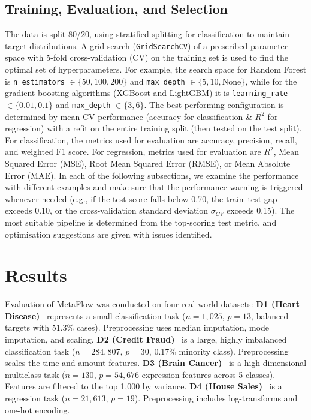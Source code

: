 \documentclass[runningheads]{llncs}
\begin{document}
\subsection{Training, Evaluation, and Selection}

The data is split 80/20, using stratified splitting for classification to maintain target distributions. A grid search (\texttt{GridSearchCV}) of a prescribed parameter space with 5-fold cross-validation (CV) on the training set is used to find the optimal set of hyperparameters. For example, the search space for Random Forest is \texttt{n\_estimators} $\in \{50, 100, 200\}$ and \texttt{max\_depth} $\in \{5, 10, \text{None}\}$, while for the gradient-boosting algorithms (XGBoost and LightGBM) it is \texttt{learning\_rate} $\in \{0.01, 0.1\}$ and \texttt{max\_depth} $\in \{3, 6\}$. The best-performing configuration is determined by mean CV performance (accuracy for classification \& $R^2$ for regression) with a refit on the entire training split (then tested on the test split). For classification, the metrics used for evaluation are accuracy, precision, recall, and weighted F1 score. For regression, metrics used for evaluation are $R^2$, Mean Squared Error (MSE), Root Mean Squared Error (RMSE), or Mean Absolute Error (MAE). In each of the following subsections, we examine the performance with different examples and make sure that the performance warning is triggered whenever needed (e.g., if the test score falls below 0.70, the train--test gap exceeds 0.10, or the cross-validation standard deviation $\sigma_{CV}$ exceeds 0.15). The most suitable pipeline is determined from the top-scoring test metric, and optimisation suggestions are given with issues identified.

\section{Results}
\label{sec:results}

Evaluation of MetaFlow was conducted on four real-world datasets:
\textbf{D1 (Heart Disease)}~\cite{janosi1988heart} represents a small classification task ($n=1{,}025$, $p=13$, balanced targets with 51.3\% cases). Preprocessing uses median imputation, mode imputation, and scaling.
\textbf{D2 (Credit Fraud)}~\cite{dalpozzolo2015fraud} is a large, highly imbalanced classification task ($n=284{,}807$, $p=30$, 0.17\% minority class). Preprocessing scales the time and amount features.
\textbf{D3 (Brain Cancer)}~\cite{feltes2019cumida} is a high-dimensional multiclass task ($n=130$, $p=54{,}676$ expression features across 5 classes). Features are filtered to the top 1,000 by variance.
\textbf{D4 (House Sales)}~\cite{harlfoxem2016kc} is a regression task ($n=21{,}613$, $p=19$). Preprocessing includes log-transforms and one-hot encoding.
\end{document}
